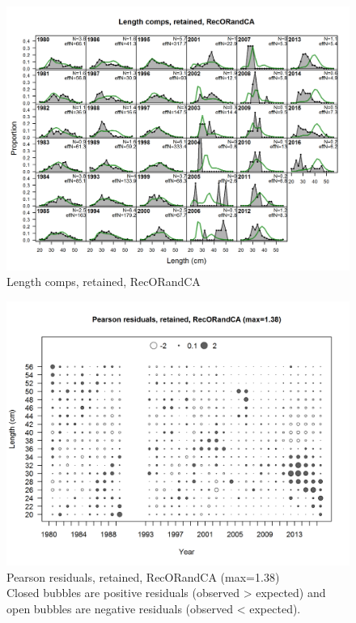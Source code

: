 \documentclass[12pt,]{article}
\begin{document}
\begin{figure}[htbp]
\centering
\includegraphics{./r4ss/plots_mod1/comp_lenfit_flt3mkt2.png}
\caption{Length comps, retained, RecORandCA
\label{fig:mod1_14_comp_lenfit_flt3mkt2}}
\end{figure}

\begin{figure}[htbp]
\centering
\includegraphics{./r4ss/plots_mod1/comp_lenfit_residsflt3mkt2.png}
\caption{Pearson residuals, retained, RecORandCA (max=1.38)\\
Closed bubbles are positive residuals (observed \textgreater{} expected)
and open bubbles are negative residuals (observed \textless{} expected).
\label{fig:mod1_15_comp_lenfit_residsflt3mkt2}}
\end{figure}
\end{document}
